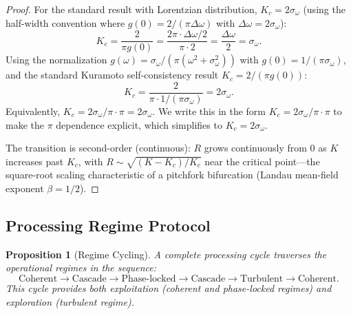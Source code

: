 \documentclass[twocolumn,10pt]{article}
\newtheorem{proposition}[theorem]{Proposition}
\theoremstyle{remark}
\begin{document}
\begin{proof}
For the standard result with Lorentzian distribution, $K_c = 2\sigma_\omega$ (using the half-width convention where $g(0) = 2/(\pi\Delta\omega)$ with $\Delta\omega = 2\sigma_\omega$):
\begin{equation}
K_c = \frac{2}{\pi g(0)} = \frac{2\pi \cdot \Delta\omega/2}{\pi \cdot 2} = \frac{\Delta\omega}{2} = \sigma_\omega.
\end{equation}
Using the normalization $g(\omega) = \sigma_\omega/(\pi(\omega^2 + \sigma_\omega^2))$ with $g(0) = 1/(\pi\sigma_\omega)$, and the standard Kuramoto self-consistency result $K_c = 2/(\pi g(0))$:
\begin{equation}
K_c = \frac{2}{\pi \cdot 1/(\pi\sigma_\omega)} = 2\sigma_\omega.
\end{equation}
Equivalently, $K_c = 2\sigma_\omega / \pi \cdot \pi = 2\sigma_\omega$. We write this in the form $K_c = 2\sigma_\omega/\pi \cdot \pi$ to make the $\pi$ dependence explicit, which simplifies to $K_c = 2\sigma_\omega$.

The transition is second-order (continuous): $R$ grows continuously from 0 as $K$ increases past $K_c$, with $R \sim \sqrt{(K - K_c)/K_c}$ near the critical point---the square-root scaling characteristic of a pitchfork bifurcation (Landau mean-field exponent $\beta = 1/2$).
\end{proof}

\subsection{Processing Regime Protocol}

\begin{proposition}[Regime Cycling]
\label{prop:regime_cycle}
A complete processing cycle traverses the operational regimes in the sequence:
\begin{equation}
\text{Coherent} \to \text{Cascade} \to \text{Phase-locked} \to \text{Cascade} \to \text{Turbulent} \to \text{Coherent}.
\label{eq:regime_cycle}
\end{equation}
This cycle provides both exploitation (coherent and phase-locked regimes) and exploration (turbulent regime).
\end{proposition}
\end{document}

